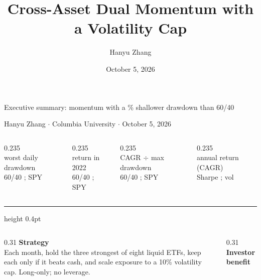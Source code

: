 \documentclass[aspectratio=169,11pt]{beamer}
\title{Cross-Asset Dual Momentum with a Volatility Cap}
\author{Hanyu Zhang}
\date{October 5, 2026}
\begin{document}
\begin{frame}[t]{Executive summary: momentum with a \DDReduction\% shallower drawdown than 60/40}
\vskip-0.05cm
{\small\color{muted}Hanyu Zhang \;$\cdot$\; Columbia University \;$\cdot$\; October 5, 2026\par}
\vskip0.45cm
\begin{columns}[T,onlytextwidth]
\begin{column}{0.235\textwidth}\centering
{\Large\color{accent}\textbf{\BthreeMDD}}\\[1pt]
{\scriptsize worst daily drawdown\\ \color{muted}60/40 \SixtyMDD; SPY \SpyMDD}
\end{column}
\begin{column}{0.235\textwidth}\centering
{\Large\color{accent}\textbf{\BthreeYtwentytwo}}\\[1pt]
{\scriptsize return in 2022\\ \color{muted}60/40 \SixtyYtwentytwo; SPY \SpyYtwentytwo}
\end{column}
\begin{column}{0.235\textwidth}\centering
{\Large\color{accent}\textbf{\BthreeCalmar}}\\[1pt]
{\scriptsize CAGR $\div$ max drawdown\\ \color{muted}60/40 \SixtyCalmar; SPY \SpyCalmar}
\end{column}
\begin{column}{0.235\textwidth}\centering
{\Large\color{accent}\textbf{\BthreeCAGR}}\\[1pt]
{\scriptsize annual return (CAGR)\\ \color{muted}Sharpe \BthreeSharpe; vol \BthreeVol}
\end{column}
\end{columns}
\vskip0.45cm
{\color{accent!40}\hrule height 0.4pt}
\vskip0.35cm
\begin{columns}[T,onlytextwidth]
\begin{column}{0.31\textwidth}
\small\textbf{\color{accent}Strategy}\\[1pt]
\footnotesize Each month, hold the three strongest of eight liquid ETFs, keep each only if it beats cash, and scale exposure to a 10\% volatility cap. Long-only; no leverage.
\end{column}
\begin{column}{0.31\textwidth}
\small\textbf{\color{accent}Investor benefit}\\[1pt]

\end{column}
\end{columns}
\end{frame}
\end{document}
